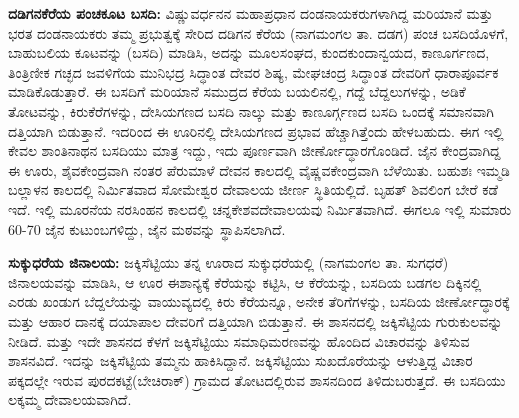 \vskip 3pt

\textbf{ದಡಿಗನಕೆರೆಯ ಪಂಚಕೂಟ ಬಸದಿ:} ವಿಷ್ಣುವರ್ಧನನ ಮಹಾಪ್ರಧಾನ ದಂಡನಾಯಕರು\-ಗಳಾಗಿದ್ದ ಮರಿಯಾನೆ ಮತ್ತು ಭರತ ದಂಡನಾಯಕರು ತಮ್ಮ ಪ್ರಭುತ್ವಕ್ಕೆ ಸೇರಿದ ದಡಿಗನ ಕೆರೆಯ (ನಾಗಮಂಗಲ ತಾ. ದಡಗ) ಪಂಚ ಬಸದಿಯೊಳಗೆ, ಬಾಹುಬಲಿಯ ಕೂಟವನ್ನು (ಬಸದಿ) ಮಾಡಿಸಿ, ಅದನ್ನು ಮೂಲಸಂಘದ, ಕುಂದಕುಂದಾನ್ವಯದ, ಕಾಣೂರ್ಗಣದ, ತಿಂತ್ರಿಣೀಕ ಗಚ್ಛದ ಜವಳಿಗೆಯ ಮುನಿಭದ್ರ ಸಿದ್ಧಾಂತ ದೇವರ ಶಿಷ್ಯ, ಮೇಘಚಂದ್ರ ಸಿದ್ಧಾಂತ ದೇವರಿಗೆ ಧಾರಾಪೂರ್ವಕ ಮಾಡಿಕೊಡುತ್ತಾರೆ. ಈ ಬಸದಿಗೆ ಮರಿಯಾನೆ ಸಮುದ್ರದ ಕೆರೆಯ ಬಯಲಿನಲ್ಲಿ, ಗದ್ದೆ ಬೆದ್ದಲುಗಳನ್ನು, ಅಡಿಕೆ ತೋಟವನ್ನು, ಕಿರುಕೆರೆಗಳನ್ನು, ದೇಸಿಯಗಣದ ಬಸದಿ ನಾಲ್ಕು ಮತ್ತು ಕಾಣೂರ್ಗ್ಗಣದ ಬಸದಿ ಒಂದಕ್ಕೆ ಸಮಾನವಾಗಿ ದತ್ತಿಯಾಗಿ ಬಿಡುತ್ತಾನೆ. ಇದರಿಂದ ಈ ಊರಿನಲ್ಲಿ ದೇಸಿಯಗಣದ ಪ್ರಭಾವ ಹೆಚ್ಚಾಗಿತ್ತೆಂದು ಹೇಳಬಹುದು. ಈಗ ಇಲ್ಲಿ ಕೇವಲ ಶಾಂತಿನಾಥನ ಬಸದಿಯು ಮಾತ್ರ ಇದ್ದು, ಇದು ಪೂರ್ಣವಾಗಿ ಜೀರ್ಣೋದ್ಧಾರಗೊಂಡಿದೆ. ಜೈನ ಕೇಂದ್ರವಾಗಿದ್ದ ಈ ಊರು, ಶೈವಕೇಂದ್ರವಾಗಿ ನಂತರ ಪೆರುಮಾಳೆ ದೇವನ ಕಾಲದಲ್ಲಿ ವೈಷ್ಣವಕೇಂದ್ರವಾಗಿ ಬೆಳೆಯಿತು. ಬಹುಶಃ ಇಮ್ಮಡಿ ಬಲ್ಲಾಳನ ಕಾಲದಲ್ಲಿ ನಿರ್ಮಿತವಾದ ಸೋಮೇಶ್ವರ ದೇವಾಲಯ ಜೀರ್ಣ ಸ್ಥಿತಿಯಲ್ಲಿದೆ. ಬೃಹತ್ ಶಿವಲಿಂಗ ಬೇರೆ ಕಡೆ ಇದೆ. ಇಲ್ಲಿ ಮೂರನೆಯ ನರಸಿಂಹನ ಕಾಲದಲ್ಲಿ ಚನ್ನಕೇಶವದೇವಾಲಯವು ನಿರ್ಮಿತವಾಗಿದೆ. ಈಗಲೂ ಇಲ್ಲಿ ಸುಮಾರು 60-70 ಜೈನ ಕುಟುಂಬಗಳಿದ್ದು, ಜೈನ ಮಠವನ್ನು ಸ್ಥಾಪಿಸಲಾಗಿದೆ.

\vskip 3pt

\textbf{ಸುಕ್ಕುಧರೆಯ ಜಿನಾಲಯ:} ಜಕ್ಕಿಸೆಟ್ಟಿಯು ತನ್ನ ಊರಾದ ಸುಕ್ಕುಧರೆಯಲ್ಲಿ (ನಾಗಮಂಗಲ ತಾ. ಸುಗಧರೆ) ಜಿನಾಲಯವನ್ನು ಮಾಡಿಸಿ, ಆ ಊರ ಈಶಾನ್ಯಕ್ಕೆ ಕೆರೆಯನ್ನು ಕಟ್ಟಿಸಿ, ಆ ಕೆರೆಯನ್ನು, ಬಸದಿಯ ಬಡಗಲ ದಿಕ್ಕಿನಲ್ಲಿ ಎರಡು ಖಂಡುಗ ಬೆದ್ದಲೆಯನ್ನು ವಾಯುವ್ಯದಲ್ಲಿ ಕಿರು ಕೆರೆಯನ್ನೂ, ಅನೇಕ ತೆರಿಗೆಗಳನ್ನು, ಬಸದಿಯ ಜೀರ್ಣೋದ್ಧಾರಕ್ಕೆ ಮತ್ತು ಆಹಾರ ದಾನಕ್ಕೆ ದಯಾಪಾಲ ದೇವರಿಗೆ ದತ್ತಿಯಾಗಿ ಬಿಡುತ್ತಾನೆ. ಈ ಶಾಸನದಲ್ಲಿ ಜಕ್ಕಿಸೆಟ್ಟಿಯ ಗುರುಕುಲವನ್ನು ನೀಡಿದೆ. ಮತ್ತು ಇದೇ ಶಾಸನದ ಕೆಳಗೆ ಜಕ್ಕಿಸೆಟ್ಟಿಯು ಸಮಾಧಿಮರಣವನ್ನು ಹೊಂದಿದ ವಿಚಾರವನ್ನು ತಿಳಿಸುವ ಶಾಸನವಿದೆ. ಇದನ್ನು ಜಕ್ಕಿಸೆಟ್ಟಿಯ ತಮ್ಮನು ಹಾಕಿಸಿದ್ದಾನೆ. ಜಕ್ಕಿಸೆಟ್ಟಿಯು ಸುಖದೊರೆಯನ್ನು ಆಳುತ್ತಿದ್ದ ವಿಚಾರ ಪಕ್ಕದಲ್ಲೇ ಇರುವ ಪುರದಕಟ್ಟೆ(ಬೇಚಿರಾಕ್​) ಗ್ರಾಮದ ತೋಟದಲ್ಲಿರುವ ಶಾಸನದಿಂದ ತಿಳಿದುಬರುತ್ತದೆ. ಈ ಬಸದಿಯು ಲಕ್ಕಮ್ಮ ದೇವಾಲಯವಾಗಿದೆ.

